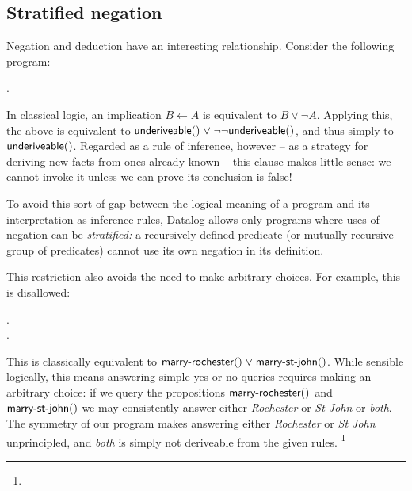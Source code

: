 

\subsection{Stratified negation}
\label{section-stratified-negation}

Negation and deduction have an interesting relationship.
%
Consider the following program:

\nopagebreak[1]
\begin{datalog}
   \gets \neg {}.
\end{datalog}

\noindent
In classical logic, an implication $B \gets A$ is equivalent to $B \vee \neg A$.
Applying this, the above is equivalent to $\atom{underiveable}{} \vee
\neg\neg\atom{underiveable}{}$, and thus simply to $\text{\sffamily underiveable}({})$.
%
Regarded as a rule of inference, however -- as a strategy for deriving new facts
from ones already known -- this clause makes little sense: we cannot invoke it
unless we can prove its conclusion is false!

To avoid this sort of gap between the logical meaning of a program and its
interpretation as inference rules, Datalog allows only programs where uses of
negation can be \emph{stratified:} a recursively defined predicate (or mutually
recursive group of predicates) cannot use its own negation in its definition.

This restriction also avoids the need to make arbitrary choices. For example,
this is disallowed:

\nopagebreak[1]
\begin{datalog}
   \gets \neg {}.\\
   \gets \neg {}.
\end{datalog}

This is classically equivalent to $\atom{marry-rochester}{} \vee
\atom{marry-st-john}{}$. While sensible logically, this means answering simple
yes-or-no queries requires making an arbitrary choice: if we query the
propositions $\text{\sffamily marry-rochester}({})$ and $\text{\sffamily marry-st-john}({})$ we
may consistently answer either \emph{Rochester} or \emph{St John} or
\emph{both}.
%
The symmetry of our program makes answering either
\emph{Rochester} or \emph{St John} unprincipled, and \emph{both} is simply
not deriveable from the given rules.%
%
\footnote{}

